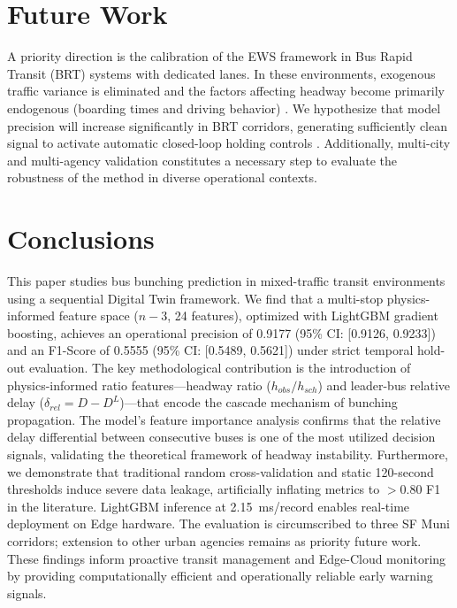 \documentclass[fleqn,10pt,lineno]{wlpeerj}
\begin{document}
\section{Future Work}
\label{sec:futurework}

A priority direction is the calibration of the EWS framework in Bus Rapid Transit (BRT)
systems with dedicated lanes. In these environments, exogenous traffic variance is eliminated
and the factors affecting headway become primarily endogenous (boarding times and driving
behavior) \citep{10,29}. We hypothesize that model precision will increase significantly in BRT
corridors, generating sufficiently clean signal to activate automatic closed-loop holding
controls \citep{30}. Additionally, multi-city and multi-agency validation constitutes a
necessary step to evaluate the robustness of the method in diverse operational contexts.

\section{Conclusions}
\label{sec:conclusion}

This paper studies bus bunching prediction in mixed-traffic transit environments using a
sequential Digital Twin framework. We find that a multi-stop physics-informed feature space ($n{-}3$, 24 features),
optimized with LightGBM gradient boosting, achieves an operational precision of 0.9177 (95\% CI: [0.9126, 0.9233]) and an F1-Score of 0.5555 (95\% CI: [0.5489, 0.5621]) under strict temporal hold-out evaluation. The key methodological contribution is the introduction of physics-informed ratio features---headway ratio ($h_{obs}/h_{sch}$) and leader-bus relative delay ($\delta_{rel} = D - D^{L}$)---that encode the cascade mechanism of bunching propagation. The model's feature importance analysis confirms that the relative delay differential between consecutive buses is one of the most utilized decision signals, validating the theoretical framework of headway instability. Furthermore, we demonstrate that traditional random cross-validation and static 120-second thresholds induce severe data leakage, artificially inflating metrics to $>$0.80 F1 in the literature. LightGBM inference at 2.15~ms/record enables real-time deployment on Edge hardware. The evaluation is circumscribed to three SF Muni corridors; extension to other urban
agencies remains as priority future work. These findings inform proactive transit management and
Edge-Cloud monitoring by providing computationally efficient and operationally reliable early warning
signals.
\end{document}
